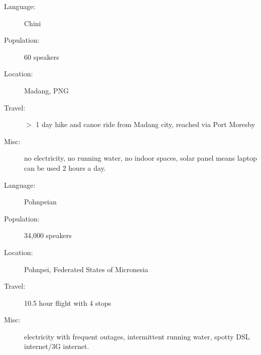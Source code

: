 \documentclass{article}
\begin{document}
\bigskip

\begin{description}
\item[Language:] Chini
\item[Population:] 60 speakers
\item[Location:] Madang, PNG
\item[Travel:] $>$ 1 day hike and canoe ride from Madang city, reached via Port Moresby 
\item[Misc:] no electricity, no running water, no indoor spaces, solar panel means laptop can be used 2 hours a day.  
\end{description}


\bigskip


\begin{description}
\item[Language:] Pohnpeian
\item[Population:] 34,000 speakers
\item[Location:] Pohnpei, Federated States of Micronesia
\item[Travel:] 10.5 hour flight with 4 stops 
\item[Misc:] electricity with frequent outages, intermittent running water, spotty DSL internet/3G internet.  
\end{description}


%
%
\end{document}
